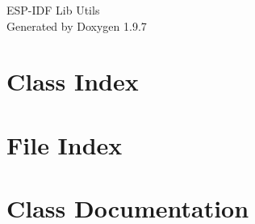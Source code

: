 \documentclass[twoside]{book}
\newcommand{\+}{\discretionary{\mbox{\scriptsize$\hookleftarrow$}}{}{}}
\newcommand{\clearemptydoublepage}{%
    \newpage{\pagestyle{empty}\cleardoublepage}%
  }
\begin{document}
  \raggedbottom
    \hypersetup{pageanchor=false,
                bookmarksnumbered=true,
                pdfencoding=unicode
               }
  \begin{titlepage}
  \vspace*{7cm}
  \begin{center}%
  {\Large ESP-\/\+IDF Lib Utils}\\
  \vspace*{1cm}
  {\large Generated by Doxygen 1.9.7}\\
  \end{center}
  \end{titlepage}
  \clearemptydoublepage
  \tableofcontents
  \clearemptydoublepage
  \hypersetup{pageanchor=true}
\chapter{Class Index}

\chapter{File Index}

\chapter{Class Documentation}



\end{document}
